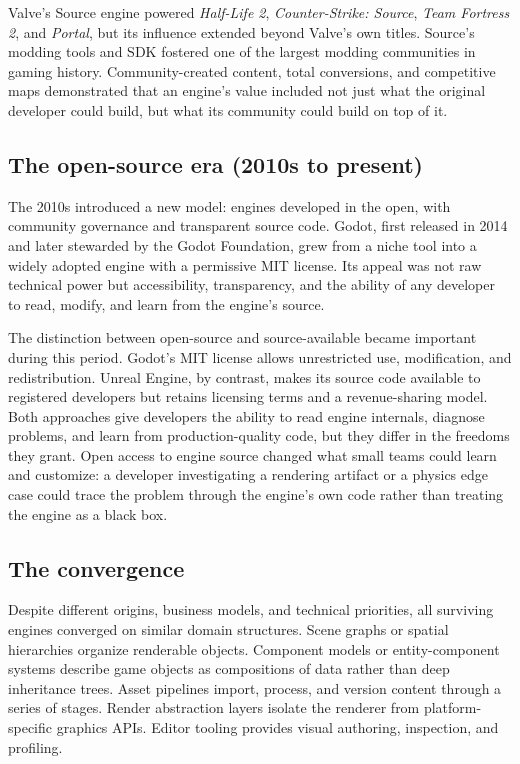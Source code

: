 \documentclass[
  11pt,
  letterpaper,
  DIV=11,
  numbers=noendperiod,
  twoside,
  open=right]{scrreprt}
\begin{document}
Valve's Source engine powered \emph{Half-Life 2}, \emph{Counter-Strike:
Source}, \emph{Team Fortress 2}, and \emph{Portal}, but its influence
extended beyond Valve's own titles. Source's modding tools and SDK
fostered one of the largest modding communities in gaming history.
Community-created content, total conversions, and competitive maps
demonstrated that an engine's value included not just what the original
developer could build, but what its community could build on top of it.

\subsection{The open-source era (2010s to
present)}\label{the-open-source-era-2010s-to-present}

The 2010s introduced a new model: engines developed in the open, with
community governance and transparent source code. Godot, first released
in 2014 and later stewarded by the Godot Foundation, grew from a niche
tool into a widely adopted engine with a permissive MIT license. Its
appeal was not raw technical power but accessibility, transparency, and
the ability of any developer to read, modify, and learn from the
engine's source.

The distinction between open-source and source-available became
important during this period. Godot's MIT license allows unrestricted
use, modification, and redistribution. Unreal Engine, by contrast, makes
its source code available to registered developers but retains licensing
terms and a revenue-sharing model. Both approaches give developers the
ability to read engine internals, diagnose problems, and learn from
production-quality code, but they differ in the freedoms they grant.
Open access to engine source changed what small teams could learn and
customize: a developer investigating a rendering artifact or a physics
edge case could trace the problem through the engine's own code rather
than treating the engine as a black box.

\subsection{The convergence}\label{the-convergence}

Despite different origins, business models, and technical priorities,
all surviving engines converged on similar domain structures. Scene
graphs or spatial hierarchies organize renderable objects. Component
models or entity-component systems describe game objects as compositions
of data rather than deep inheritance trees. Asset pipelines import,
process, and version content through a series of stages. Render
abstraction layers isolate the renderer from platform-specific graphics
APIs. Editor tooling provides visual authoring, inspection, and
profiling.
\end{document}
